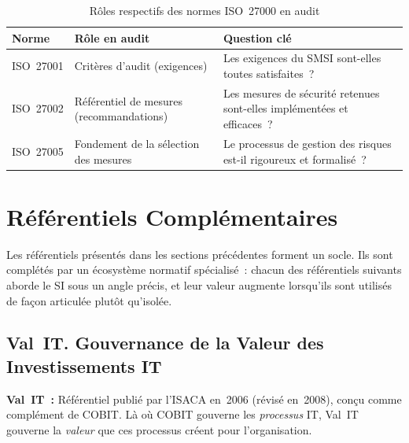 \begin{table}[h!]
\centering
\small
\renewcommand{\arraystretch}{1.4}
\begin{tabular}{|p{2.4cm}|p{4.0cm}|p{5.6cm}|}
    \hline
    \rowcolor{blue!10}
    \textbf{Norme} & \textbf{Rôle en audit} & \textbf{Question clé} \\ \hline
    ISO~27001 & Critères d'audit (exigences) &
        Les exigences du SMSI sont-elles toutes satisfaites~? \\ \hline
    ISO~27002 & Référentiel de mesures (recommandations) &
        Les mesures de sécurité retenues sont-elles implémentées et efficaces~? \\ \hline
    ISO~27005 & Fondement de la sélection des mesures &
        Le processus de gestion des risques est-il rigoureux et formalisé~? \\ \hline
\end{tabular}
\caption{Rôles respectifs des normes ISO~27000 en audit}
\end{table}
\section{Référentiels Complémentaires}
\label{sec:referentiels-complementaires}

Les référentiels présentés dans les sections précédentes forment un socle. Ils sont complétés par
un écosystème normatif spécialisé~: chacun des référentiels suivants aborde le SI sous un angle
précis, et leur valeur augmente lorsqu'ils sont utilisés de façon articulée plutôt qu'isolée.

\subsection{Val~IT. Gouvernance de la Valeur des Investissements IT}
\label{subsec:val-it}

\begin{boxdef}
\textbf{Val~IT~:} Référentiel publié par l'ISACA en~2006 (révisé en~2008), conçu comme
complément de COBIT. Là où COBIT gouverne les \emph{processus} IT, Val~IT gouverne la
\emph{valeur} que ces processus créent pour l'organisation.
\end{boxdef}

